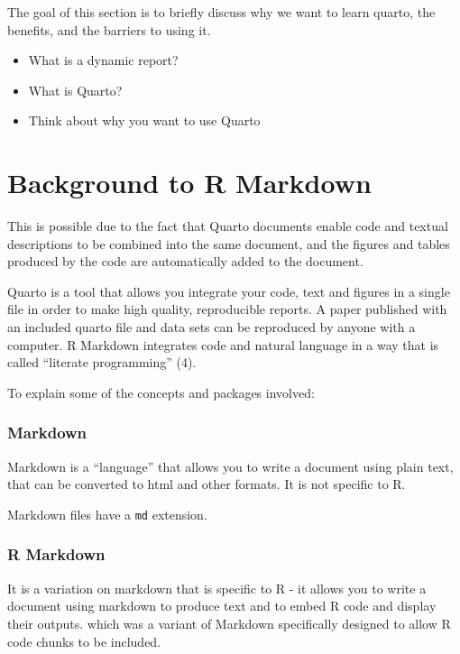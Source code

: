 \documentclass[
  letterpaper,
  DIV=11,
  numbers=noendperiod]{scrreprt}
\providecommand{\tightlist}{%
  \setlength{\itemsep}{0pt}\setlength{\parskip}{0pt}}\usepackage{longtable,booktabs,array}
\begin{document}
The goal of this section is to briefly discuss why we want to learn
quarto, the benefits, and the barriers to using it.

\begin{itemize}
\tightlist
\item
  What is a dynamic report?
\item
  What is Quarto?
\item
  Think about why you want to use Quarto
\end{itemize}

\hypertarget{background-to-r-markdown}{%
\section{Background to R Markdown}\label{background-to-r-markdown}}

This is possible due to the fact that Quarto documents enable code and
textual descriptions to be combined into the same document, and the
figures and tables produced by the code are automatically added to the
document.

Quarto is a tool that allows you integrate your code, text and figures
in a single file in order to make high quality, reproducible reports. A
paper published with an included quarto file and data sets can be
reproduced by anyone with a computer. R Markdown integrates code and
natural language in a way that is called ``literate programming'' (4).

To explain some of the concepts and packages involved:

\hypertarget{markdown}{%
\subsubsection{Markdown}\label{markdown}}

Markdown is a ``language'' that allows you to write a document using
plain text, that can be converted to html and other formats. It is not
specific to R.

Markdown files have a \texttt{md} extension.

\hypertarget{r-markdown}{%
\subsubsection{R Markdown}\label{r-markdown}}

It is a variation on markdown that is specific to R - it allows you to
write a document using markdown to produce text and to embed R code and
display their outputs. which was a variant of Markdown specifically
designed to allow R code chunks to be included.
\end{document}
